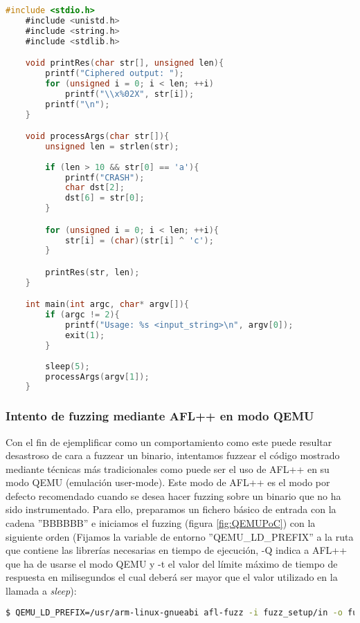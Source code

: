 \begin{lstlisting}[language=C, caption=Código de ejemplo a fuzzear., captionpos=b,
    frame=single, breaklines, showstringspaces=false]
    #include <stdio.h>
    #include <unistd.h>
    #include <string.h>
    #include <stdlib.h>

    void printRes(char str[], unsigned len){
        printf("Ciphered output: ");
        for (unsigned i = 0; i < len; ++i)
            printf("\\x%02X", str[i]);
        printf("\n");
    }

    void processArgs(char str[]){
        unsigned len = strlen(str);
        
        if (len > 10 && str[0] == 'a'){
            printf("CRASH");
            char dst[2];
            dst[6] = str[0];
        }

        for (unsigned i = 0; i < len; ++i){
            str[i] = (char)(str[i] ^ 'c');
        }

        printRes(str, len);
    }

    int main(int argc, char* argv[]){
        if (argc != 2){
            printf("Usage: %s <input_string>\n", argv[0]);
            exit(1);
        }
        
        sleep(5);
        processArgs(argv[1]);
    }
\end{lstlisting}

\subsubsection{Intento de fuzzing mediante AFL++ en modo QEMU}
Con el fin de ejemplificar como un comportamiento como este puede resultar desastroso de cara a fuzzear un binario, intentamos fuzzear el 
código mostrado mediante técnicas más tradicionales como puede ser el uso de AFL++ en su modo QEMU (emulación user-mode). Este modo de AFL++ es el 
modo por defecto recomendado cuando se desea hacer fuzzing sobre un binario que no ha sido instrumentado. Para ello, preparamos un fichero básico de entrada con la cadena ''BBBBBB'' e iniciamos el fuzzing (figura \ref{fig:QEMUPoC}) con la siguiente orden (Fijamos la variable de entorno
''QEMU\_LD\_PREFIX'' a la ruta que contiene las librerías necesarias en tiempo de ejecución, -Q indica a AFL++ que ha de usarse el modo QEMU y
-t el valor del límite máximo de tiempo de respuesta en milisegundos el cual deberá ser mayor que el valor utilizado en la llamada a \textit{sleep}):

\begin{lstlisting}[language=bash]
    $ QEMU_LD_PREFIX=/usr/arm-linux-gnueabi afl-fuzz -i fuzz_setup/in -o fuzz_setup/out -Q -t 7000 -- ./bin/main_arm @@
\end{lstlisting}

